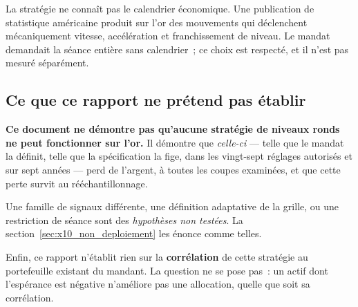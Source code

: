 La stratégie ne connaît pas le calendrier économique. Une publication de
statistique américaine produit sur l'or des mouvements qui déclenchent
mécaniquement vitesse, accélération et franchissement de niveau. Le mandat
demandait la séance entière sans calendrier~; ce choix est respecté, et il
n'est pas mesuré séparément.

\subsection{Ce que ce rapport ne prétend pas établir}

\begin{insightbox}
\textbf{Ce document ne démontre pas qu'aucune stratégie de niveaux ronds ne
peut fonctionner sur l'or.} Il démontre que \emph{celle-ci} --- telle que le
mandat la définit, telle que la spécification la fige, dans les vingt-sept
réglages autorisés et sur sept années --- perd de l'argent, à toutes les
coupes examinées, et que cette perte survit au rééchantillonnage.

Une famille de signaux différente, une définition adaptative de la grille, ou
une restriction de séance sont des \emph{hypothèses non testées}. La
section~\ref{sec:x10_non_deploiement} les énonce comme telles.
\end{insightbox}

Enfin, ce rapport n'établit rien sur la \textbf{corrélation} de cette
stratégie au portefeuille existant du mandant. La question ne se pose pas~: un
actif dont l'espérance est négative n'améliore pas une allocation, quelle que
soit sa corrélation.
